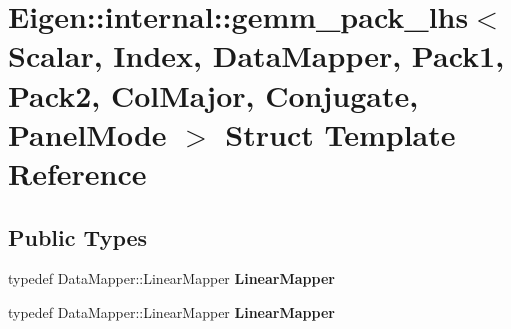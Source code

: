 \hypertarget{struct_eigen_1_1internal_1_1gemm__pack__lhs_3_01_scalar_00_01_index_00_01_data_mapper_00_01_pack35996411e68d7a1338c3213e7fcd18dc}{}\section{Eigen\+:\+:internal\+:\+:gemm\+\_\+pack\+\_\+lhs$<$ Scalar, Index, Data\+Mapper, Pack1, Pack2, Col\+Major, Conjugate, Panel\+Mode $>$ Struct Template Reference}
\label{struct_eigen_1_1internal_1_1gemm__pack__lhs_3_01_scalar_00_01_index_00_01_data_mapper_00_01_pack35996411e68d7a1338c3213e7fcd18dc}
\subsection*{Public Types}
\begin{DoxyCompactItemize}
\item 
\mbox{\label{struct_eigen_1_1internal_1_1gemm__pack__lhs_3_01_scalar_00_01_index_00_01_data_mapper_00_01_pack35996411e68d7a1338c3213e7fcd18dc_a397f541012bef2e86e43b340904522b6}} 
typedef Data\+Mapper\+::\+Linear\+Mapper {\bfseries Linear\+Mapper}
\item 
\mbox{\label{struct_eigen_1_1internal_1_1gemm__pack__lhs_3_01_scalar_00_01_index_00_01_data_mapper_00_01_pack35996411e68d7a1338c3213e7fcd18dc_a397f541012bef2e86e43b340904522b6}} 
typedef Data\+Mapper\+::\+Linear\+Mapper {\bfseries Linear\+Mapper}
\end{DoxyCompactItemize}
